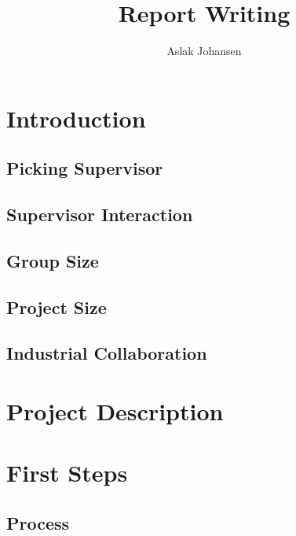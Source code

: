 \documentclass[a4paper]{memoir}
\title{Report Writing \\ \scalebox{0.85}{for Software BSc and MSc Projects}}
\author{Aslak Johansen}
\begin{document}
\maketitle
\tableofcontents

\chapter{Introduction}

\section{Picking Supervisor}

\section{Supervisor Interaction}

\section{Group Size}

\section{Project Size}

\section{Industrial Collaboration}

\chapter{Project Description}

\chapter{First Steps}

\section{Process}
\end{document}
